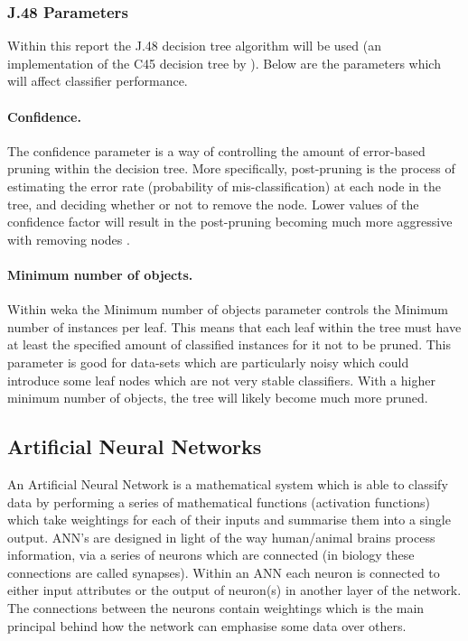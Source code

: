 \documentclass[12pt]{article}
\begin{document}
    \subsubsection{J.48 Parameters}
      Within this report the J.48 decision tree algorithm will be used (an implementation of the C45 decision tree by \cite{quinlan2014c4}). Below are the parameters which will affect classifier performance.

      \paragraph{Confidence.}
        The confidence parameter is a way of controlling the amount of error-based pruning \citep{quinlan1987simplifying} within the decision tree. More specifically, post-pruning is the process of estimating the error rate (probability of mis-classification) at each node in the tree, and deciding whether or not to remove the node. Lower values of the confidence factor will result in the post-pruning becoming much more aggressive with removing nodes \citep{beck2008backward}.

      \paragraph{Minimum number of objects.}
        Within weka the Minimum number of objects parameter controls the Minimum number of instances per leaf. This means that each leaf within the tree must have at least the specified amount of classified instances for it not to be pruned. This parameter is good for data-sets which are particularly noisy which could introduce some leaf nodes which are not very stable classifiers. With a higher minimum number of objects, the tree will likely become much more pruned.


  \subsection{Artificial Neural Networks} \label{ann}
    An Artificial Neural Network is a mathematical system which is able to classify data by performing a series of mathematical functions (activation functions) which take weightings for each of their inputs and summarise them into a single output. ANN's are designed in light of the way human/animal brains process information, via a series of neurons which are connected (in biology these connections are called synapses). Within an ANN each neuron is connected to either input attributes or the output of neuron(s) in another layer of the network. The connections between the neurons contain weightings which is the main principal behind how the network can emphasise some data over others.
\end{document}

